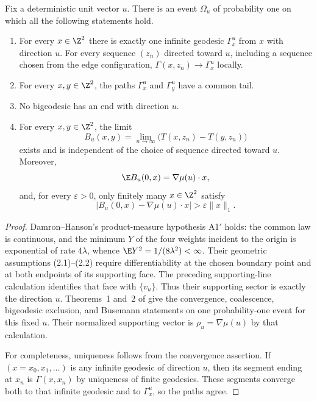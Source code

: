 \begin{corollary}\label{cor:fixed-direction}
Fix a deterministic unit vector $u$. There is an event $\Omega_u$ of
probability one on which all the following statements hold.
\begin{enumerate}
\item For every $x\in\Z^2$ there is exactly one infinite geodesic
      $\Gamma_x^u$ from $x$ with direction $u$. For every sequence $(z_n)$
      directed toward $u$, including a sequence chosen from the edge
      configuration,
      $\Gamma(x,z_n)\to\Gamma_x^u$ locally.
\item For every $x,y\in\Z^2$, the paths $\Gamma_x^u$ and
      $\Gamma_y^u$ have a common tail.
\item No bigeodesic has an end with direction $u$.
\item For every $x,y\in\Z^2$, the limit
\[
 B_u(x,y)=\lim_{n\to\infty}\bigl(T(x,z_n)-T(y,z_n)\bigr)
\]
      exists and is independent of the choice of sequence directed toward
      $u$. Moreover,
\[
 \E B_u(0,x)=\nabla\mu(u)\cdot x,
\]
      and, for every $\varepsilon>0$, only finitely many $x\in\Z^2$
      satisfy
\[
 |B_u(0,x)-\nabla\mu(u)\cdot x|>\varepsilon\lVert x\rVert_1.
\]
\end{enumerate}
\end{corollary}

\begin{proof}
Damron--Hanson's product-measure hypothesis A1$'$ holds: the common law
is continuous, and the minimum $Y$ of the four weights incident to the
origin is exponential of rate $4\lambda$, whence
$\E Y^2=1/(8\lambda^2)<\infty$.
Their geometric assumptions (2.1)--(2.2) require differentiability at
the chosen boundary point and at both endpoints of its supporting face.
The preceding supporting-line calculation identifies that face with
$\{v_u\}$. Thus their supporting sector is exactly the direction $u$.
Theorems~1 and~2 of \cite{DH2017} give the convergence, coalescence,
bigeodesic exclusion, and Busemann statements on one probability-one
event for this fixed $u$. Their normalized supporting vector is
$\rho_u=\nabla\mu(u)$ by that calculation.

For completeness, uniqueness follows from the convergence assertion.
If $(x=x_0,x_1,\ldots)$ is any infinite geodesic of direction $u$, then
its segment ending at $x_n$ is $\Gamma(x,x_n)$ by uniqueness of finite
geodesics. These segments converge both to that infinite geodesic and
to $\Gamma_x^u$, so the paths agree.
\end{proof}

